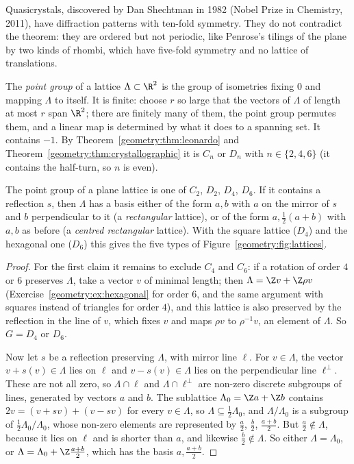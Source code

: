 \begin{remark}
Quasicrystals, discovered by Dan Shechtman in 1982 (Nobel Prize in Chemistry, 2011), have diffraction patterns with ten-fold symmetry. They
do not contradict the theorem: they are ordered but not periodic, like Penrose's tilings of the plane by two kinds of rhombi, which have
five-fold symmetry and no lattice of translations.
\end{remark}

The \emph{point group} of a lattice $\Lambda\subset\R^2$ is the group of isometries fixing $0$ and mapping $\Lambda$ to itself. It is
finite: choose $r$ so large that the vectors of $\Lambda$ of length at most $r$ span $\R^2$; there are finitely many of them, the
point group permutes them, and a linear map is determined by what it does to a spanning set. It contains $-1$. By
Theorem~\ref{geometry:thm:leonardo} and Theorem~\ref{geometry:thm:crystallographic} it is $C_n$ or $D_n$ with $n\in\{2,4,6\}$ (it contains the half-turn,
so $n$ is even).

\begin{proposition}\label{geometry:prop:fivelattices}
The point group of a plane lattice is one of $C_2$, $D_2$, $D_4$, $D_6$. If it contains a reflection $s$, then $\Lambda$ has a basis
either of the form $a,b$ with $a$ on the mirror of $s$ and $b$ perpendicular to it (a \emph{rectangular} lattice), or of the form
$a,\frac12(a+b)$ with $a,b$ as before (a \emph{centred rectangular} lattice). With the square lattice ($D_4$) and the hexagonal one ($D_6$)
this gives the five types of Figure~\ref{geometry:fig:lattices}.
\end{proposition}
\begin{proof}
For the first claim it remains to exclude $C_4$ and $C_6$: if a rotation of order $4$ or $6$ preserves $\Lambda$, take a vector $v$ of
minimal length; then $\Lambda=\Z v+\Z\rho v$ (Exercise~\ref{geometry:ex:hexagonal} for order $6$, and the same argument with squares instead of triangles for
order $4$), and this lattice is also preserved by the reflection in the line of $v$, which fixes $v$ and maps $\rho v$ to
$\rho^{-1}v$, an element of $\Lambda$. So $G=D_4$ or $D_6$.

Now let $s$ be a reflection preserving $\Lambda$, with mirror line $\ell$. For $v\in\Lambda$, the vector $v+s(v)\in\Lambda$ lies on $\ell$
and $v-s(v)\in\Lambda$ lies on the perpendicular line $\ell^\perp$. These are not all zero, so $\Lambda\cap\ell$ and $\Lambda\cap\ell^\perp$
are non-zero discrete subgroups of lines, generated by vectors $a$ and $b$. The sublattice $\Lambda_0=\Z a+\Z b$ contains $2v=(v+sv)+(v-sv)$
for every $v\in\Lambda$, so $\Lambda\subseteq\frac12\Lambda_0$, and $\Lambda/\Lambda_0$ is a subgroup of $\frac12\Lambda_0/\Lambda_0$, whose
non-zero elements are represented by $\frac a2$, $\frac b2$, $\frac{a+b}2$. But $\frac a2\notin\Lambda$, because it lies on $\ell$ and is
shorter than $a$, and likewise $\frac b2\notin\Lambda$. So either $\Lambda=\Lambda_0$, or $\Lambda=\Lambda_0+\Z\frac{a+b}2$, which has the
basis $a,\frac{a+b}2$.
\end{proof}

